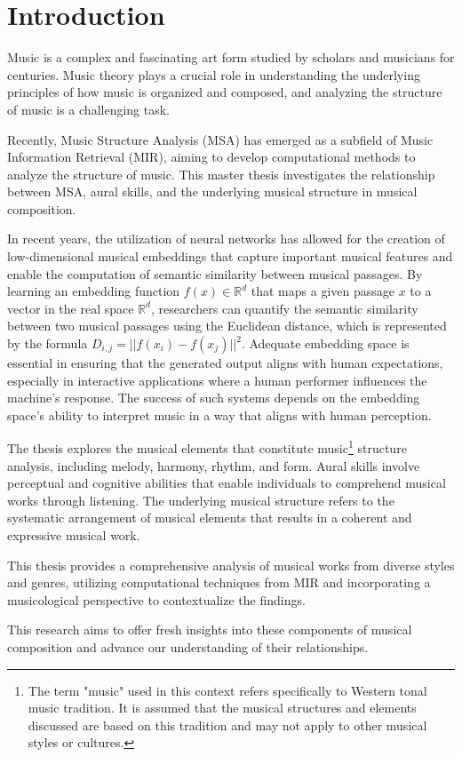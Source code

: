 \chapter{Introduction}

Music is a complex and fascinating art form studied by scholars and musicians for centuries. Music theory plays a crucial role in understanding the underlying principles of how music is organized and composed, and analyzing the structure of music is a challenging task. 

Recently, Music Structure Analysis (MSA) has emerged as a subfield of Music Information Retrieval (MIR), aiming to develop computational methods to analyze the structure of music. This master thesis investigates the relationship between MSA, aural skills, and the underlying musical structure in musical composition. 

In recent years, the utilization of neural networks has allowed for the creation of low-dimensional musical embeddings that capture important musical features and enable the computation of semantic similarity between musical passages. By learning an embedding function $f(x) \in \mathbb{R}^d$ that maps a given passage $x$ to a vector in the real space $\mathbb{R}^d$, researchers can quantify the semantic similarity between two musical passages using the Euclidean distance, which is represented by the formula $D_{i,j} = ||f(x_i) - f(x_j)||^2$. Adequate embedding space is essential in ensuring that the generated output aligns with human expectations, especially in interactive applications where a human performer influences the machine's response. The success of such systems depends on the embedding space's ability to interpret music in a way that aligns with human perception.

The thesis explores the musical elements that constitute music\footnote{The term "music" used in this context refers specifically to Western tonal music tradition. It is assumed that the musical structures and elements discussed are based on this tradition and may not apply to other musical styles or cultures.} structure analysis, including melody, harmony, rhythm, and form. Aural skills involve perceptual and cognitive abilities that enable individuals to comprehend musical works through listening. The underlying musical structure refers to the systematic arrangement of musical elements that results in a coherent and expressive musical work. 

This thesis provides a comprehensive analysis of musical works from diverse styles and genres, utilizing computational techniques from MIR and incorporating a musicological perspective to contextualize the findings. 

This research aims to offer fresh insights into these components of musical composition and advance our understanding of their relationships.